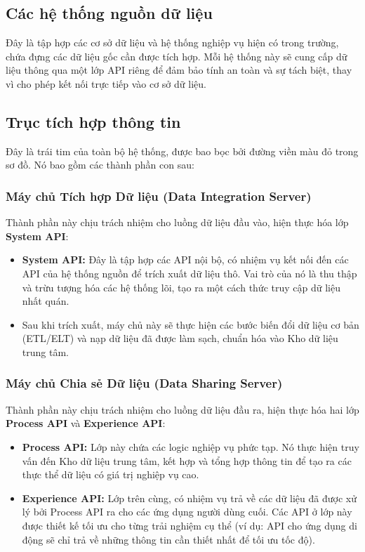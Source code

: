 \subsection{Các hệ thống nguồn dữ liệu}
Đây là tập hợp các cơ sở dữ liệu và hệ thống nghiệp vụ hiện có trong trường, chứa đựng các dữ liệu gốc cần được tích hợp. Mỗi hệ thống này sẽ cung cấp dữ liệu thông qua một lớp API riêng để đảm bảo tính an toàn và sự tách biệt, thay vì cho phép kết nối trực tiếp vào cơ sở dữ liệu.

\subsection{Trục tích hợp thông tin}
Đây là trái tim của toàn bộ hệ thống, được bao bọc bởi đường viền màu đỏ trong sơ đồ. Nó bao gồm các thành phần con sau:

\subsubsection{Máy chủ Tích hợp Dữ liệu (Data Integration Server)}
Thành phần này chịu trách nhiệm cho luồng dữ liệu đầu vào, hiện thực hóa lớp \textbf{System API}:
\begin{itemize}
    \item \textbf{System API:} Đây là tập hợp các API nội bộ, có nhiệm vụ kết nối đến các API của hệ thống nguồn để trích xuất dữ liệu thô. Vai trò của nó là thu thập và trừu tượng hóa các hệ thống lõi, tạo ra một cách thức truy cập dữ liệu nhất quán.
    \item Sau khi trích xuất, máy chủ này sẽ thực hiện các bước biến đổi dữ liệu cơ bản (ETL/ELT) và nạp dữ liệu đã được làm sạch, chuẩn hóa vào Kho dữ liệu trung tâm.
\end{itemize}

\subsubsection{Máy chủ Chia sẻ Dữ liệu (Data Sharing Server)}
Thành phần này chịu trách nhiệm cho luồng dữ liệu đầu ra, hiện thực hóa hai lớp \textbf{Process API} và \textbf{Experience API}:
\begin{itemize}
    \item \textbf{Process API:} Lớp này chứa các logic nghiệp vụ phức tạp. Nó thực hiện truy vấn đến Kho dữ liệu trung tâm, kết hợp và tổng hợp thông tin để tạo ra các thực thể dữ liệu có giá trị nghiệp vụ cao.
    \item \textbf{Experience API:} Lớp trên cùng, có nhiệm vụ trả về các dữ liệu đã được xử lý bởi Process API ra cho các ứng dụng người dùng cuối. Các API ở lớp này được thiết kế tối ưu cho từng trải nghiệm cụ thể (ví dụ: API cho ứng dụng di động sẽ chỉ trả về những thông tin cần thiết nhất để tối ưu tốc độ).
\end{itemize}

